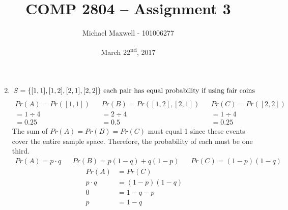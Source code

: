 \documentclass{article}
\title{COMP 2804 -- Assignment 3}
\author{Michael Maxwell - 101006277}
\date{March 22\textsuperscript{nd}, 2017}
\begin{document}
	\maketitle

	\begin{enumerate}
		\setcounter{enumi}{1}
		\item %
			\[
				S = \{[1,1], [1,2], [2,1], [2,2]\} \text{ each pair has equal probability if using fair coins} \\
			\]
			\begin{align*}
				Pr(A) = Pr([1,1]) && Pr(B) = Pr([1,2], [2,1]) && Pr(C) = Pr([2,2])\\
				= 1 \div 4 && = 2 \div 4 && = 1 \div 4\\
				= 0.25 && = 0.5 && = 0.25
			\end{align*}
			The sum of $Pr(A) = Pr(B) = Pr(C)$ must equal 1 since these events cover the entire sample space. Therefore, the probability of each must be one third.
			\begin{align*}
				Pr(A) = p \cdot q && Pr(B) = p(1 - q) + q(1 - p) && Pr(C) = (1 - p) (1 - q)
			\end{align*}
			\begin{align*}
				Pr(A) &= Pr(C)\\
				p \cdot q &= (1 - p) (1 - q) \\
				0 &= 1 - q - p \\
				p &= 1 - q
			\end{align*}
				

\end{enumerate}
\end{document}
